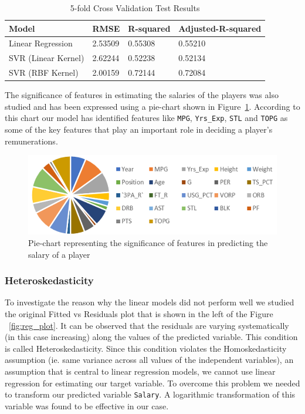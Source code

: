 \documentclass{article}
\begin{document}
\begin{table}[H]
\caption{5-fold Cross Validation Test Results}
  \label{table:Preliminary results}
  \centering
\begin{tabular}{@{}llll@{}}
\toprule
Model               & RMSE    & R-squared & Adjusted-R-squared \\ \midrule
Linear Regression   & 2.53509 & 0.55308   & 0.55210            \\
SVR (Linear Kernel) & 2.62244  & 0.52238   & 0.52134            \\
SVR (RBF Kernel)    & 2.00159 & 0.72144    & 0.72084            \\ \bottomrule
\end{tabular}
\end{table}

The significance of features in estimating the salaries of the players was also studied and has been expressed using a pie-chart shown in Figure~\ref{fig:reg_chart}. 
According to this chart our model has identified features like \texttt{MPG}, \texttt{Yrs\_Exp}, \texttt{STL} and \texttt{TOPG} as some of the key features that play an important role in deciding a player's remunerations.

\begin{figure}[H]
	\centering
	\includegraphics[width=\textwidth] {reg_fig1_pie_chart.PNG}
	\caption{Pie-chart representing the significance of features in predicting the salary of a player}
	\label{fig:reg_chart}
\end{figure}

\subsubsection{Heteroskedasticity}
To investigate the reason why the linear models did not perform well we studied the original Fitted vs Residuals plot that is shown in the left of the Figure ~\ref{fig:reg_plot}.
It can be observed that the residuals are varying systematically (in this case increasing) along the values of the predicted variable.
This condition is called Heteroskedasticity. 
Since this condition violates the Homoskedasticity assumption (ie. same variance across all values of the independent variables), an assumption that is central to linear regression models, we cannot use
linear regression for estimating our target variable.
To overcome this problem we needed to transform our predicted variable \texttt{Salary}.
A logarithmic transformation of this variable was found to be effective in our case.
\end{document}
